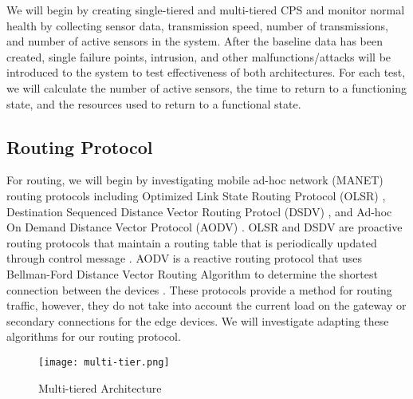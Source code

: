 \documentclass[../main.tex]{subfiles}
\begin{document}
We will begin by creating single-tiered and multi-tiered CPS and monitor normal health by collecting sensor data, transmission speed, number of transmissions, and number of active sensors in the system. After the baseline data has been created, single failure points, intrusion, and other malfunctions/attacks will be introduced to the system to test effectiveness of both architectures. For each test, we will calculate the number of active sensors, the time to return to a functioning state, and the resources used to return to a functional state.



\subsection{Routing Protocol}
For routing, we will begin by investigating mobile ad-hoc network (MANET)  routing protocols including Optimized Link State Routing Protocol (OLSR) , Destination Sequenced Distance Vector Routing Protocl (DSDV) , and Ad-hoc On Demand Distance Vector Protocol (AODV) . OLSR and DSDV are proactive routing protocols that maintain a routing table that is periodically updated through control message \cite{7724222,7724851}. AODV is a reactive routing protocol that uses Bellman-Ford Distance Vector Routing Algorithm to determine the shortest connection between the devices \cite{7724222}. These protocols provide a method for routing traffic, however, they do not take into account the current load on the gateway or secondary connections for the edge devices. We will investigate adapting these algorithms for our routing protocol. 




\begin{figure}[!htb]
    \centering
    \texttt{[image: multi-tier.png]}
    \caption{Multi-tiered Architecture}
    \label{fig:multi_tier}
\end{figure}

\end{document}
